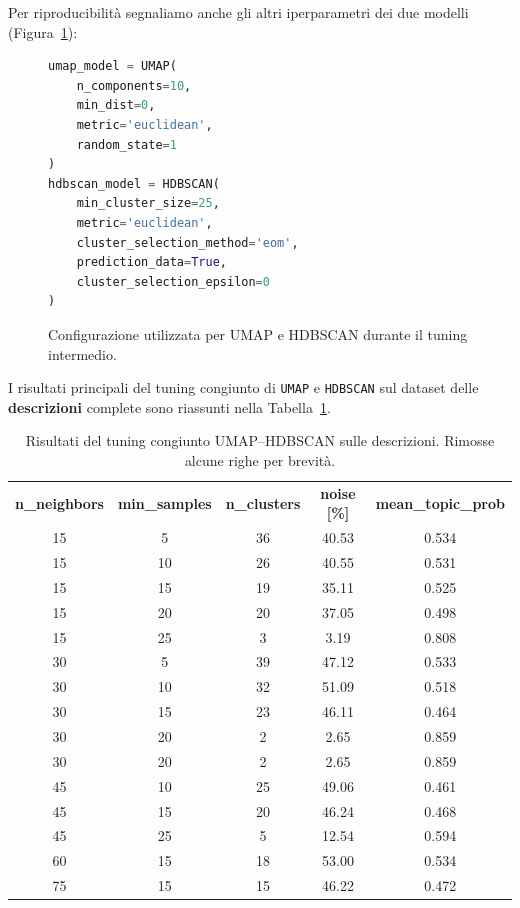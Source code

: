 Per riproducibilità segnaliamo anche gli altri iperparametri dei due modelli (Figura~\ref{fig:umap-hdbscan-config}): 
\begin{figure}[H]
\centering
\begin{lstlisting}[language=Python]
umap_model = UMAP(
    n_components=10,
    min_dist=0,
    metric='euclidean',
    random_state=1
)
hdbscan_model = HDBSCAN(
    min_cluster_size=25,
    metric='euclidean',
    cluster_selection_method='eom',
    prediction_data=True,
    cluster_selection_epsilon=0
)
\end{lstlisting}
\caption{Configurazione utilizzata per UMAP e HDBSCAN durante il tuning intermedio.}
\label{fig:umap-hdbscan-config}
\end{figure}

\noindent
I risultati principali del tuning congiunto di \texttt{UMAP} e \texttt{HDBSCAN} sul dataset delle \textbf{descrizioni} complete sono riassunti nella Tabella~\ref{tab:tuning_umap_hdbscan_desc}.

\begin{table}[H]
\centering
\caption{Risultati del tuning congiunto UMAP–HDBSCAN sulle descrizioni. Rimosse alcune righe per brevità.}
\label{tab:tuning_umap_hdbscan_desc}
\begin{tabular}{ccccc}
\textbf{n\_neighbors} & \textbf{min\_samples} & \textbf{n\_clusters} & \textbf{noise [\%]} & \textbf{mean\_topic\_prob} \\
15 & 5  & 36 & 40.53 & 0.534 \\
15 & 10 & 26 & 40.55 & 0.531 \\
15 & 15 & 19 & 35.11 & 0.525 \\
15 & 20 & 20 & 37.05 & 0.498 \\
15 & 25 & 3  & 3.19  & 0.808 \\
30 & 5  & 39 & 47.12 & 0.533 \\
30 & 10 & 32 & 51.09 & 0.518 \\
30 & 15 & 23 & 46.11 & 0.464 \\
30 & 20 & 2  & 2.65  & 0.859 \\
30 & 20 & 2  & 2.65  & 0.859 \\
45 & 10 & 25 & 49.06 & 0.461 \\
45 & 15 & 20 & 46.24 & 0.468 \\
45 & 25 & 5  & 12.54 & 0.594 \\
60 & 15 & 18 & 53.00 & 0.534 \\
75 & 15 & 15 & 46.22 & 0.472 \\
\end{tabular}
\end{table}

